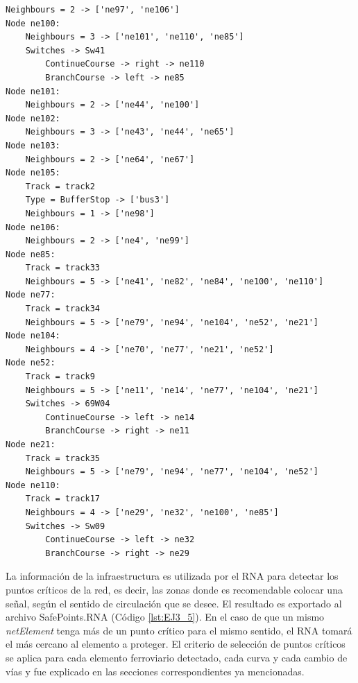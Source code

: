 \begin{lstlisting}[language = {}, tabsize=4, basicstyle=\footnotesize\ttfamily, showspaces=false, showstringspaces=false, caption = Infrastructure.RNA, label = {lst:EJ3_4}]
	Neighbours = 2 -> ['ne97', 'ne106']
Node ne100:
	Neighbours = 3 -> ['ne101', 'ne110', 'ne85']
	Switches -> Sw41
		ContinueCourse -> right -> ne110
		BranchCourse -> left -> ne85
Node ne101:
	Neighbours = 2 -> ['ne44', 'ne100']
Node ne102:
	Neighbours = 3 -> ['ne43', 'ne44', 'ne65']
Node ne103:
	Neighbours = 2 -> ['ne64', 'ne67']
Node ne105:
	Track = track2
	Type = BufferStop -> ['bus3']
	Neighbours = 1 -> ['ne98']
Node ne106:
	Neighbours = 2 -> ['ne4', 'ne99']
Node ne85:
	Track = track33
	Neighbours = 5 -> ['ne41', 'ne82', 'ne84', 'ne100', 'ne110']
Node ne77:
	Track = track34
	Neighbours = 5 -> ['ne79', 'ne94', 'ne104', 'ne52', 'ne21']
Node ne104:
	Neighbours = 4 -> ['ne70', 'ne77', 'ne21', 'ne52']
Node ne52:
	Track = track9
	Neighbours = 5 -> ['ne11', 'ne14', 'ne77', 'ne104', 'ne21']
	Switches -> 69W04
		ContinueCourse -> left -> ne14
		BranchCourse -> right -> ne11
Node ne21:
	Track = track35
	Neighbours = 5 -> ['ne79', 'ne94', 'ne77', 'ne104', 'ne52']
Node ne110:
	Track = track17
	Neighbours = 4 -> ['ne29', 'ne32', 'ne100', 'ne85']
	Switches -> Sw09
		ContinueCourse -> left -> ne32
		BranchCourse -> right -> ne29
\end{lstlisting}

	La información de la infraestructura es utilizada por el RNA para detectar los puntos críticos de la red, es decir, las zonas donde es recomendable colocar una señal, según el sentido de circulación que se desee. El resultado es exportado al archivo SafePoints.RNA (Código \ref{lst:EJ3_5}). En el caso de que un mismo \textit{netElement} tenga más de un punto crítico para el mismo sentido, el RNA tomará el más cercano al elemento a proteger. El criterio de selección de puntos críticos se aplica para cada elemento ferroviario detectado, cada curva y cada cambio de vías y fue explicado en las secciones correspondientes ya mencionadas.
	
